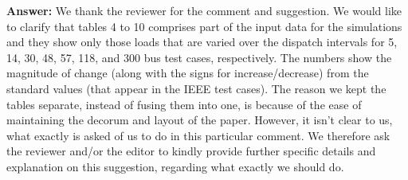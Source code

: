 \documentclass[8pt]{article}
\begin{document}
{\begin{enumerate}
    \textnormal{\textbf{Answer: } We thank the reviewer for the comment and suggestion. We would like to clarify that tables 4 to 10 comprises part of the input data for the simulations and they show only those loads that are varied over the dispatch intervals for 5, 14, 30, 48, 57, 118, and 300 bus test cases, respectively. The numbers show the magnitude of change (along with the signs for increase/decrease) from the standard values (that appear in the IEEE test cases). The reason we kept the tables separate, instead of fusing them into one, is because of the ease of maintaining the decorum and layout of the paper. However, it isn't clear to us, what exactly is asked of us to do in this particular comment. We therefore ask the reviewer and/or the editor to kindly provide further specific details and explanation on this suggestion, regarding what exactly we should do.}
\end{enumerate}
}\\
%

\end{document}
